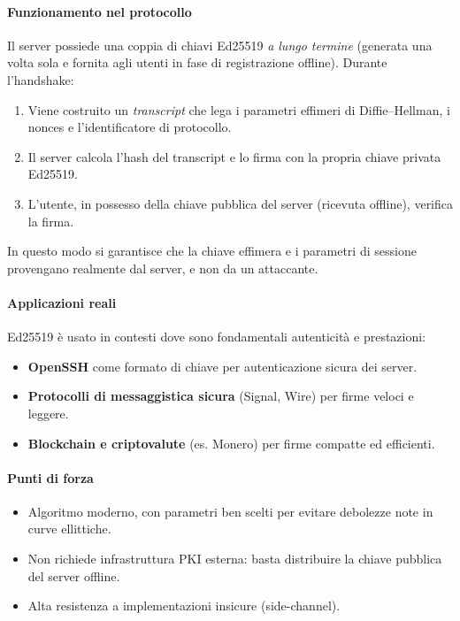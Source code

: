 \paragraph{Funzionamento nel protocollo}
Il server possiede una coppia di chiavi Ed25519 \emph{a lungo termine} (generata una volta sola e 
fornita agli utenti in fase di registrazione offline). Durante l'handshake:
\begin{enumerate}
  \item Viene costruito un \emph{transcript} che lega i parametri effimeri di Diffie--Hellman, i nonces e 
        l'identificatore di protocollo.
  \item Il server calcola l'hash del transcript e lo firma con la propria chiave privata Ed25519.
  \item L'utente, in possesso della chiave pubblica del server (ricevuta offline), verifica la firma.
\end{enumerate}
In questo modo si garantisce che la chiave effimera e i parametri di sessione provengano realmente 
dal server, e non da un attaccante.

\paragraph{Applicazioni reali}
Ed25519 è usato in contesti dove sono fondamentali autenticità e prestazioni:
\begin{itemize}
  \item \textbf{OpenSSH} come formato di chiave per autenticazione sicura dei server.
  \item \textbf{Protocolli di messaggistica sicura} (Signal, Wire) per firme veloci e leggere.
  \item \textbf{Blockchain e criptovalute} (es. Monero) per firme compatte ed efficienti.
\end{itemize}

\paragraph{Punti di forza}
\begin{itemize}
  \item Algoritmo moderno, con parametri ben scelti per evitare debolezze note in curve ellittiche.
  \item Non richiede infrastruttura PKI esterna: basta distribuire la chiave pubblica del server offline.
  \item Alta resistenza a implementazioni insicure (side-channel).
\end{itemize}

